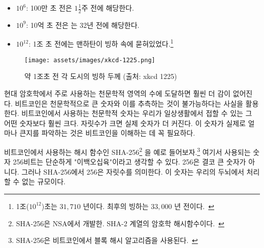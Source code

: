 \begin{itemize}
  \item $10^6$: 100만 초 전은 $1 \frac{1}{2}$주 전에 해당한다.
  \item $10^9$: 10억 초 전은 는 32년 전에 해당한다.
  \item $10^{12}$: 1조 초 전에는 맨하탄이 빙하 속에 묻혀있었다.\footnote{1조($10^{12}$)초는 $31,710$ 년이다. 최후의 빙하는 $33,000$ 년 전이다.~\cite{wiki:LGM}}
\end{itemize}

\begin{figure}
  \texttt{[image: assets/images/xkcd-1225.png]}
  \caption{약 1조초 전 각 도시의 빙하 두께 (출처: xkcd 1225)}
  \label{fig:xkcd-1225}
\end{figure}

\begin{comment}
As soon as we enter the beyond-astronomical realm of modern
cryptography, our intuition fails catastrophically. Bitcoin is built
around large numbers and the virtual impossibility of guessing them.
These numbers are way, way larger than anything we might encounter in
day-to-day life. Many orders of magnitude larger. Understanding how
large these numbers truly are is essential to understanding Bitcoin as a
whole.
\end{comment}
현대 암호학에서 주로 사용하는 천문학적 영역의 수에 도달하면 훨씬 더 감이 없어진다.
비트코인은 천문학적으로 큰 숫자와 이를 추측하는 것이 불가능하다는 사실을 활용한다.
비트코인에서 사용하는 천문학적 숫자는 우리가 일상생활에서 접할 수 있는 그 어떤 숫자보다 훨씬 크다. 자릿수가 크면 실제 숫자가 더 커진다.
이 숫자가 실제로 얼마나 큰지를 파악하는 것은 비트코인을 이해하는 데 꼭 필요하다.

\begin{comment}
Let's take SHA-256\footnote{SHA-256 is part of the SHA-2 family of cryptographic
hash functions developed by the NSA.~\cite{wiki:sha2}}, one of the hash
functions\footnote{Bitcoin uses SHA-256 in its block hashing
algorithm.~\cite{btcwiki:block-hashing}} used in Bitcoin, as a concrete example.
It is only natural to think about 256 bits as \enquote{two hundred fifty-six,} which
isn't a large number at all. However, the number in SHA-256 is talking about
orders of magnitude --- something our brains are not well-equipped to deal with.
\end{comment}
비트코인에서 사용하는 해시 함수인 SHA-256\footnote{SHA-256은 NSA에서 개발한. SHA-2 계열의  암호학 해시함수이다.~\cite{wiki:sha2}}
을 예로 들어보자.\footnote{SHA-256은 비트코인에서 블록 해시 알고리즘을 사용된다.~\cite{btcwiki:block-hashing}} 
여기서 사용되는 숫자 256비트는 단순하게 "이백오십육"이라고 생각할 수 있다. 256은 결코 큰 숫자가 아니다.
그러나 SHA-256에서 256은 자릿수를 의미한다. 
이 숫자는 우리의 두뇌에서 처리할 수 없는 규모이다.

